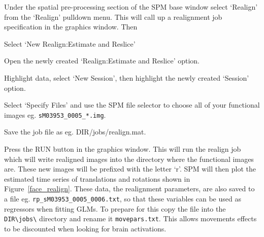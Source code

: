 Under the spatial pre-processing section of the SPM base window select `Realign' from the `Realign' pulldown menu. This will call up a realignment job specification 
in the graphics window.
Then
\bi
\item{Select `New Realign:Estimate and Reslice'}
\item{Open the newly created `Realign:Estimate and Reslice' option.}
\item{Highlight data, select `New Session', then highlight the newly created `Session' option.} 
\item{Select `Specify Files' and use the SPM file selector
to choose all of your functional images eg. \verb!sM03953_0005_*.img!.}
\item{Save the job file as eg. {\sf DIR/jobs/realign.mat}}.
\item{Press the RUN button in the graphics window.}
\ei
This 
will run the realign job which will write realigned images into the directory where the functional images
are. These new images will be prefixed with the letter `r'. SPM will then plot the estimated time series of translations and rotations shown in Figure~\ref{face_realign}. These data, the realignment parameters, are also saved to 
a file eg. \verb!rp_sM03953_0005_0006.txt!, so that these variables can be used as regressors when fitting GLMs. To prepare for this copy the file into the 
\verb!DIR\jobs\! directory and rename it \verb!movepars.txt!.
This allows movements effects to be discounted when
looking for brain activations.

